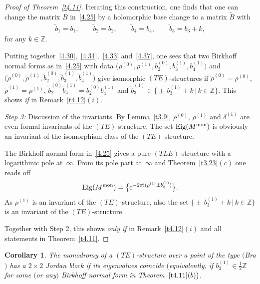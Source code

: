 \documentclass[pdftex]{sigma}%
\numberwithin{equation}{section}
\numberwithin{figure}{section}
\newcommand{\Z}{{\mathbb Z}}
\newcommand{\www}{\widetilde}
\DeclareMathOperator{\Eig}{Eig}
\newtheorem{Corollary}[Theorem]{Corollary}
\begin{document}
\begin{proof}[Proof of Theorem~\ref{t4.11}]
Iterating this construction, one finds that one can
change the matrix $B$ in~\eqref{4.25} by a holomorphic
base change to a matrix $\www B$ with
\begin{gather}\label{4.37}
\www b_1=b_1,\qquad
\www b_2=b_2,\qquad
\www b_4=b_4,\qquad
\www b_3=b_3+k,
\end{gather}
for any $k\in\Z$.

Putting together~\eqref{4.30},~\eqref{4.31},~\eqref{4.33}
and~\eqref{4.37}, one sees that two Birkhoff normal forms
as in~\eqref{4.25}
with data $\big(\rho^{(0)},\rho^{(1)},b_2^{(0)},b_3^{(1)},b_4^{(1)}\big)$
and $\big(\www \rho^{(0)},\www \rho^{(1)},\www b_2^{(0)},\www b_3^{(1)},
\www b_4^{(1)}\big)$ give isomorphic $(TE)$-structures
if $\www \rho^{(0)}=\rho^{(0)}$, $\www\rho^{(1)}=\rho^{(1)}$,
$\www b_2^{(0)}\www b_4^{(1)}=b_2^{(0)} b_4^{(1)}$
and $\www b_3^{(1)}\in \big\{{\pm}\, b_3^{(1)}+k\,|\, k\in\Z\big\}$.
This shows {\it if} in Remark~\ref{t4.12}$(i)$.

\medskip\noindent
{\it Step 3:} Discussion of the invariants.
By Lemma~\ref{t3.9}, $\rho^{(0)}$, $\rho^{(1)}$ and $\delta^{(1)}$
are even formal inva\-ri\-ants of the $(TE)$-structure.
The set $\Eig(M^{\rm mon})$ is obviously an invariant of the
isomorphism class of the $(TE)$-structure.

The Birkhoff normal form in~\eqref{4.25} gives a pure
$(TLE)$-structure with a logarithmic pole at~$\infty$.
From its pole part at~$\infty$
and Theorem~\ref{t3.23}$(c)$ one reads off
\begin{gather*}%
\Eig(M^{\rm mon})=\big\{{\rm e}^{-2\pi {\rm i}(\rho^{(1)}\pm b_3^{(1)})}\big\}.
\end{gather*}
As $\rho^{(1)}$ is an invariant of the $(TE)$-structure,
also the set $\big\{{\pm}\, b_3^{(1)}+k\,|\, k\in\Z\big\}$
is an invariant of the $(TE)$-structure.

Together with Step 2, this shows {\it only if} in
Remark~\ref{t4.12}$(i)$ and all statements in Theo\-rem~\ref{t4.11}.
\end{proof}

\begin{Corollary}%
The monodromy of a $(TE)$-structure over a point
of the type $($Bra$)$ has a $2\times 2$ Jordan block if its
eigenvalues coincide $\big($equivalently, if
$b_3^{(1)}\in\frac{1}{2}\Z$ for some $($or any$)$
Birkhoff normal form in Theorem~$\ref{t4.11}(b)\big)$.
\end{Corollary}
\end{document}
